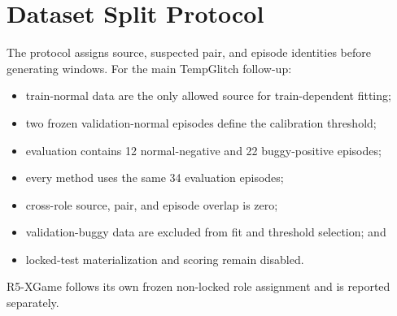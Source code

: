 \section{Dataset Split Protocol}
\label{app:dataset-split-protocol}

The protocol assigns source, suspected pair, and episode identities before generating windows.
For the main TempGlitch follow-up:
\begin{itemize}[leftmargin=*]
\item train-normal data are the only allowed source for train-dependent fitting;
\item two frozen validation-normal episodes define the calibration threshold;
\item evaluation contains 12 normal-negative and 22 buggy-positive episodes;
\item every method uses the same 34 evaluation episodes;
\item cross-role source, pair, and episode overlap is zero;
\item validation-buggy data are excluded from fit and threshold selection; and
\item locked-test materialization and scoring remain disabled.
\end{itemize}

R5-XGame follows its own frozen non-locked role assignment and is reported separately.
